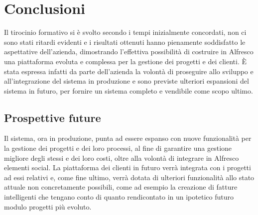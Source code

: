 
%
%
%
%
\chapter{Conclusioni}
\label{cap:conclusioni}

Il tirocinio formativo si è svolto secondo i tempi inizialmente concordati,
 non ci sono stati ritardi evidenti e i risultati ottenuti hanno pienamente
soddisfatto le aspettative dell’azienda, dimostrando l'effettiva possibilità di costruire in 
Alfresco una piattaforma evoluta e complessa per la gestione dei progetti e dei clienti. È stata
espressa infatti da parte dell’azienda la volontà di proseguire allo sviluppo e all’integrazione
del sistema in produzione e sono previste ulteriori espansioni del sistema in futuro, per fornire un sistema completo e vendibile come scopo ultimo.
\section{Prospettive future}
Il sistema, ora in produzione, punta ad essere espanso con nuove funzionalità per la gestione dei progetti e dei loro processi, al fine di garantire una gestione migliore degli stessi e dei loro costi, oltre alla volontà di integrare in Alfresco elementi social.
La piattaforma dei clienti in futuro verrà integrata con i progetti ad essi relativi e, come fine ultimo, verrà dotata di ulteriori funzionalità allo stato attuale non concretamente possibili, come ad esempio la creazione di fatture intelligenti che tengano conto di quanto rendicontato in un ipotetico futuro modulo progetti più evoluto.
